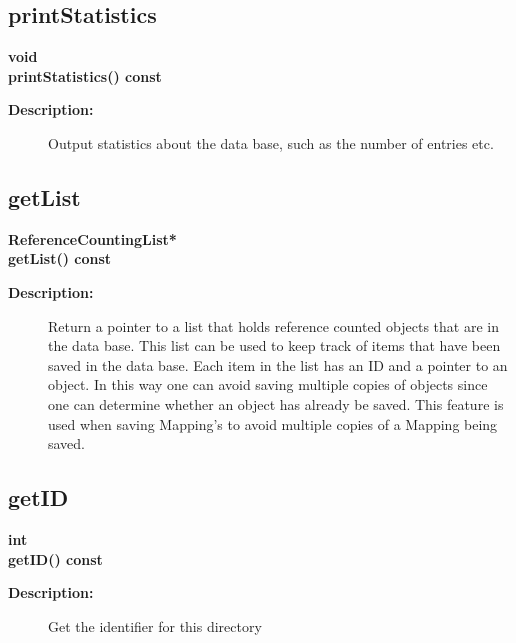 \subsection{printStatistics}
 
\begin{flushleft} \textbf{%
void   \\ 
\settowidth{\GenericDataBaseIncludeArgIndent}{printStatistics(}%
printStatistics() const 
}\end{flushleft}
    
\begin{description}
\item[{\bf Description:}]  
   Output statistics about the data base, such as the number of entries etc.

\end{description}
\subsection{getList}
 
\begin{flushleft} \textbf{%
ReferenceCountingList*  \\ 
\settowidth{\GenericDataBaseIncludeArgIndent}{getList(}%
getList() const
}\end{flushleft}
\begin{description}
\item[{\bf Description:}]  
   Return a pointer to a list that holds reference counted objects that are in the data base.
 This list can be used to keep track of items that have been saved in the data base. Each item
 in the list has an ID and a pointer to an object. In this way one can avoid saving multiple
 copies of objects since one can determine whether an object has already be saved. This feature
 is used when saving Mapping's to avoid multiple copies of a Mapping being saved.
\end{description}
\subsection{getID}
 
\begin{flushleft} \textbf{%
int  \\ 
\settowidth{\GenericDataBaseIncludeArgIndent}{getID(}%
getID() const
}\end{flushleft}
\begin{description}
\item[{\bf Description:}]  
   Get the identifier for this directory
\end{description}
